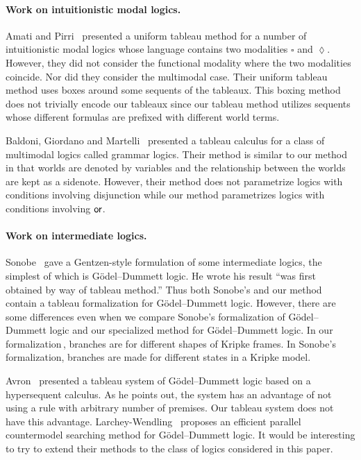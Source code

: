 \paragraph{Work on intuitionistic modal logics.}

Amati and Pirri~\cite{amati94} presented a uniform tableau method for a number of
intuitionistic modal logics whose language contains two modalities
$\square$ and $\lozenge$.
However, they did not consider the functional modality where the two
modalities coincide.  Nor did they consider the multimodal case.
Their uniform tableau method uses boxes around some sequents of the
tableaux.  This boxing method does not trivially encode our tableaux since our
tableau method utilizes sequents whose different formulas are prefixed
with different world terms.

Baldoni, Giordano and Martelli~\cite{baldoni98} presented a tableau
calculus for a class of multimodal logics called grammar logics.
Their method is similar to our method in that worlds are denoted by
variables and the relationship between the worlds are kept as a
sidenote.
However, their method does not parametrize logics with conditions involving
disjunction while our method parametrizes logics with conditions
involving $\mathbin{\mathsf{or}}$.

\paragraph{Work on intermediate logics.}

Sonobe~\cite{sonobe} gave a Gentzen-style formulation of some
intermediate logics, the simplest of which is G\"{o}del--Dummett logic.
He wrote his result ``was first obtained by way of tableau method.''
Thus both Sonobe's and our method contain a tableau formalization for
G\"{o}del--Dummett logic.  However, there are some differences even when
we compare Sonobe's formalization of G\"odel--Dummett logic and our
specialized method for G\"odel--Dummett logic.
In our formalization\,\LB, branches are for different shapes of Kripke
frames.  In Sonobe's formalization, branches are made for different
states in a Kripke model.

Avron~\cite{avron2000} presented a tableau system of G\"odel--Dummett logic
based on a hypersequent calculus.
As he points out, the system has an advantage of not using a rule with
arbitrary number of
premises.  Our tableau system does not have this advantage.
Larchey-Wendling~\cite{countermodelsearch} proposes an efficient parallel
countermodel searching method for G\"odel--Dummett logic.
It would be interesting to try to extend their methods to the
class of logics considered in this paper.

